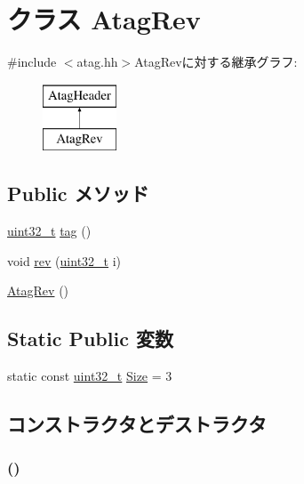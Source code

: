 \hypertarget{classAtagRev}{
\section{クラス AtagRev}
\label{classAtagRev}
}


{\ttfamily \#include $<$atag.hh$>$}AtagRevに対する継承グラフ:\begin{figure}[H]
\begin{center}
\leavevmode
\includegraphics[height=2cm]{classAtagRev}
\end{center}
\end{figure}
\subsection*{Public メソッド}
\begin{DoxyCompactItemize}
\item 
\hyperlink{Type_8hh_a435d1572bf3f880d55459d9805097f62}{uint32\_\-t} \hyperlink{classAtagRev_afe29fbb80b1d2765e37e98c6d259ea52}{tag} ()
\item 
void \hyperlink{classAtagRev_aabdf2f80aa3b23597642f98b1b83eeba}{rev} (\hyperlink{Type_8hh_a435d1572bf3f880d55459d9805097f62}{uint32\_\-t} i)
\item 
\hyperlink{classAtagRev_ac1bb9e7f0b3553ba3e4872162f98ab51}{AtagRev} ()
\end{DoxyCompactItemize}
\subsection*{Static Public 変数}
\begin{DoxyCompactItemize}
\item 
static const \hyperlink{Type_8hh_a435d1572bf3f880d55459d9805097f62}{uint32\_\-t} \hyperlink{classAtagRev_a7ecea14dd0f3277e19580d4509fafdba}{Size} = 3
\end{DoxyCompactItemize}


\subsection{コンストラクタとデストラクタ}
\hypertarget{classAtagRev_ac1bb9e7f0b3553ba3e4872162f98ab51}{
\subsubsection[{AtagRev}]{ ()}}
\label{classAtagRev_ac1bb9e7f0b3553ba3e4872162f98ab51}



